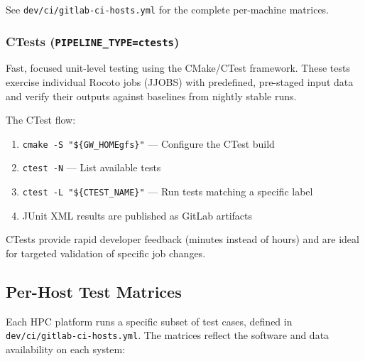\documentclass[11pt,letterpaper,twoside]{article}
\begin{document}
See \texttt{dev/ci/gitlab-ci-hosts.yml} for the complete per-machine matrices.

\subsubsection{CTests (\texttt{PIPELINE\_TYPE=ctests})}
\label{sec:ctests}

Fast, focused unit-level testing using the CMake/CTest framework. These tests
exercise individual Rocoto jobs (JJOBS) with predefined, pre-staged input data
and verify their outputs against baselines from nightly stable runs.

The CTest flow:

\begin{enumerate}[leftmargin=1.5em]
  \item \texttt{cmake -S "\$\{GW\_HOMEgfs\}"} --- Configure the CTest build
  \item \texttt{ctest -N} --- List available tests
  \item \texttt{ctest -L "\$\{CTEST\_NAME\}"} --- Run tests matching a specific label
  \item JUnit XML results are published as GitLab artifacts
\end{enumerate}

CTests provide rapid developer feedback (minutes instead of hours) and are
ideal for targeted validation of specific job changes.

\subsection{Per-Host Test Matrices}
\label{sec:host-matrices}

Each HPC platform runs a specific subset of test cases, defined in
\texttt{dev/ci/gitlab-ci-hosts.yml}. The matrices reflect the software and data
availability on each system:
\end{document}
